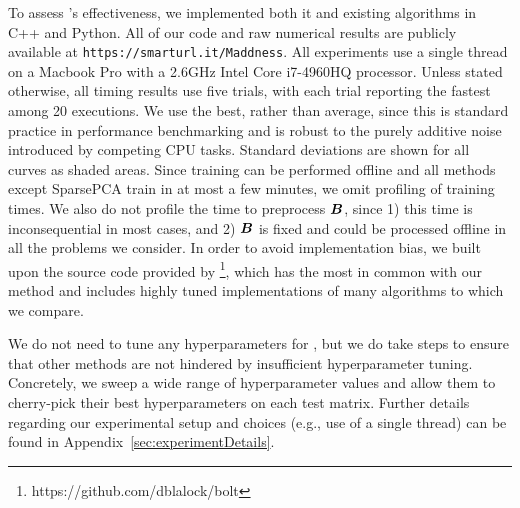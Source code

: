 
To assess \ours's effectiveness, we implemented both it and existing algorithms in C++ and Python. All of our code and raw numerical results are publicly available at \texttt{https://smarturl.it/Maddness}. All experiments use a single thread on a Macbook Pro with a 2.6GHz Intel Core i7-4960HQ processor. Unless stated otherwise, all timing results use five trials, with each trial reporting the fastest among 20 executions. We use the best, rather than average, since this is standard practice in performance benchmarking and is robust to the purely additive noise introduced by competing CPU tasks. Standard deviations are shown for all curves as shaded areas.
Since training can be performed offline and all methods except SparsePCA \cite{sparsePCA} train in at most a few minutes, we omit profiling of training times. We also do not profile the time to preprocess $\bm{B}$, since 1) this time is inconsequential in most cases, and 2) $\bm{B}$ is fixed and could be processed offline in all the problems we consider.
In order to avoid implementation bias, we built upon the source code provided by \citep{bolt}\footnote{https://github.com/dblalock/bolt}, which has the most in common with our method and includes highly tuned implementations of many algorithms to which we compare.


We do not need to tune any hyperparameters for \ours, but we do take steps to ensure that other methods are not hindered by insufficient hyperparameter tuning. Concretely, we sweep a wide range of hyperparameter values and allow them to cherry-pick their best hyperparameters on each test matrix.
Further details regarding our experimental setup and choices (e.g., use of a single thread) can be found in Appendix~\ref{sec:experimentDetails}.



